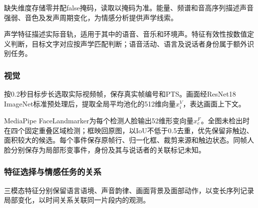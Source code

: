 缺失维度存储零并配false掩码，读取以掩码为准。能量、频谱和音高序列描述声音强弱、音色及发声周期变化，为情感分析提供声学线索。

声学特征描述实际音轨，适用于其中的语音、音乐和环境声。特征有效性按数值定义判断，目标文字对应按声学匹配判断；语音活动、语言及说话者身份属于额外识别任务。

\hypertarget{q1-ux89c6ux89c9}{%
\subsubsection{视觉}\label{q1-ux89c6ux89c9}}

按0.2秒目标步长选取实际视频帧，保存真实帧编号和PTS。画面经ResNet18\cite{q1-ref2} ImageNet标准预处理后，提取全局平均池化的512维向量\(x^V_i\)，表达画面上下文。

MediaPipe FaceLandmarker\cite{q1-ref3}为每个检测人脸输出52维形变向量\(x^F_e\)。全图未检出时在四个固定重叠区域检测；框映回原图，以IoU不低于0.5去重，优先保留非触边、面积较大的候选。每个事件保存原帧行、归一化框、裁剪来源和触边状态。同帧人脸分别保存为局部形变事件，身份及其与说话者的关联标记未知。

\hypertarget{q1-ux7279ux5f81ux9009ux62e9ux4e0eux60c5ux611fux4efbux52a1ux7684ux5173ux7cfb}{%
\subsubsection{特征选择与情感任务的关系}\label{q1-ux7279ux5f81ux9009ux62e9ux4e0eux60c5ux611fux4efbux52a1ux7684ux5173ux7cfb}}

三模态特征分别保留语言语境、声音韵律、画面背景及面部动作，以变长序列记录局部变化，以时间关系关联同一片段内的观测。

